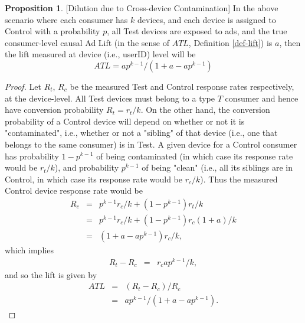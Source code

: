 \documentclass[11pt,a4paper]{article}
\theoremstyle{definition}
\theoremstyle{remark}
\theoremstyle{definition}
\theoremstyle{definition}
\theoremstyle{definition}
\theoremstyle{definition}
\theoremstyle{definition}
\theoremstyle{definition}
\newtheorem{proposition}[theorem]{Proposition}
\begin{document}
\begin{proposition}\small [Dilution due to Cross-device Contamination]
	In the above scenario where each consumer has $k$ devices, and each device is assigned to Control with a probability $p$, all Test devices are exposed to ads, and the true consumer-level causal Ad Lift (in the sense of $ATL$, Definition \ref{def-lift}) is $a$, then the lift measured at device (i.e., userID) level will be 
\begin{equation} \label{eq-atl-contam}
	ATL = 	a p^{k-1}/(1 + a - a p^{k-1})
\end{equation}	

\end{proposition}
\begin{proof}\small
Let $R_t$, $R_c$ be the measured Test and Control response rates respectively, at the device-level.
All Test devices must belong to a type $T$ consumer and hence have conversion probability $R_t = r_t/k$. 
On the other hand, the conversion probability of a Control device will depend on whether or not it is "contaminated", i.e., whether or not a "sibling" of that device (i.e., one that belongs to the same consumer) is in Test.
A given device for a Control consumer has probability $1-p^{k-1}$ of being contaminated (in which case its response rate would be $r_t/k$), and probability  $p^{k-1}$ of being "clean" (i.e., all its siblings are in Control, in which case its response rate would be $r_c/k$). 
Thus the measured Control device response rate would be 
\begin{eqnarray}
R_c & = & p^{k-1} r_c/k + (1- p^{k-1})r_t/k \\
    & = & p^{k-1} r_c/k + (1- p^{k-1})r_c(1+a)/k \\
    & = & (1 + a - a p^{k-1})r_c/k,
\end{eqnarray}
which implies 
\begin{eqnarray}
R_t - R_c & = & r_c a p^{k-1}/k,
\end{eqnarray}
and so the lift is given by 
\begin{eqnarray}
ATL & = & (R_t - R_c)/R_c \\
        & = & a p^{k-1}/(1 + a - a p^{k-1}).
\end{eqnarray}
\end{proof}
\end{document}
